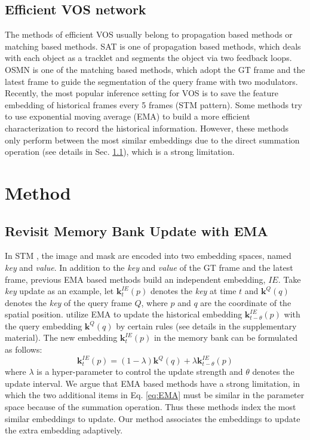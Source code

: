 \documentclass[10pt,twocolumn,letterpaper]{article}
\begin{document}
\subsection{Efficient VOS network}
\vspace{-0.3em}
The methods of efficient VOS usually belong to propagation based methods or matching based methods. SAT \cite{chen2020state} is one of propagation based methods, which deals with each object as a tracklet and segments the object via two feedback loops. OSMN \cite{yang2018efficient} is one of the matching based methods, which adopt the GT frame and the latest frame to guide the segmentation of the query frame with two modulators. Recently, the most popular inference setting for VOS is to save the feature embedding of historical frames every 5 frames (STM pattern). Some methods \cite{li2020fast, liang2020video, wang2021swiftnet} try to use exponential moving average (EMA) to build a more efficient characterization to record the historical information. However, these methods only perform between the most similar embeddings due to the direct summation operation (see details in Sec. \ref{subsec:revisit}), which is a strong limitation. 






\section{Method}
\subsection{Revisit Memory Bank Update with EMA}
\label{subsec:revisit}
In STM \cite{oh2019video}, the image and mask are encoded into two embedding spaces, named \textit{key} and \textit{value}. In addition to the \textit{key} and \textit{value} of the GT frame and the latest frame, previous EMA based methods build an independent embedding, $IE$. Take \textit{key} update as an example, let $\textbf{k}_t^{IE}(p)$ denotes the \textit{key} at time $t$ and $\textbf{k}^{Q}(q)$ denotes the \textit{key} of the  query frame  $Q$, where $p$ and $q$ are the coordinate of the spatial position. \cite{li2020fast, liang2020video} utilize EMA to update the historical embedding $\textbf{k}^{IE}_{t-\theta}(p)$ with the query embedding  $\textbf{k}^{Q}(q)$ by certain rules (see details in the supplementary material). The new embedding $\textbf{k}^{IE}_t(p)$ in the memory bank can be formulated as follows:
\begin{equation}
\textbf{k}^{IE}_t(p) = (1-\lambda)\textbf{k}^{Q}(q) + \lambda \textbf{k}^{IE}_{t-\theta}(p)
\label{eq:EMA}
\end{equation}
where $\lambda$ is a hyper-parameter to control the update strength and $\theta$ denotes the update interval. We argue that EMA based methods have a strong limitation, in which the two additional items in Eq. \ref{eq:EMA} must be similar in the parameter space because of the summation operation. Thus these methods \cite{li2020fast, liang2020video} index the most similar embeddings to update.  Our method associates the embeddings to update the extra embedding adaptively.
\end{document}
